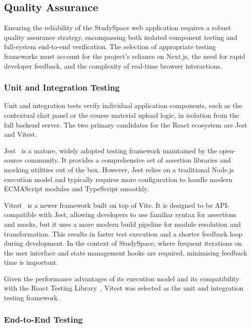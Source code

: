 \subsection{Quality Assurance}
\label{subsec:quality-assurance}

Ensuring the reliability of the StudySpace web application requires a robust quality assurance strategy, encompassing both isolated component testing and full-system end-to-end verification. The selection of appropriate testing frameworks must account for the project's reliance on Next.js, the need for rapid developer feedback, and the complexity of real-time browser interactions.

\subsubsection{Unit and Integration Testing}
\label{subsubsec:unit-integration-testing}

Unit and integration tests verify individual application components, such as the contextual chat panel or the course material upload logic, in isolation from the full backend server. The two primary candidates for the React ecosystem are Jest and Vitest.

Jest~\cite{Jest} is a mature, widely adopted testing framework maintained by the open-source community. It provides a comprehensive set of assertion libraries and mocking utilities out of the box. However, Jest relies on a traditional Node.js execution model and typically requires more configuration to handle modern ECMAScript modules and TypeScript smoothly.

Vitest~\cite{Vitest} is a newer framework built on top of Vite. It is designed to be API-compatible with Jest, allowing developers to use familiar syntax for assertions and mocks, but it uses a more modern build pipeline for module resolution and transformation. This results in faster test execution and a shorter feedback loop during development. In the context of StudySpace, where frequent iterations on the user interface and state management hooks are required, minimising feedback time is important.

Given the performance advantages of its execution model and its compatibility with the React Testing Library~\cite{ReactTestingLibrary}, Vitest was selected as the unit and integration testing framework.

\subsubsection{End-to-End Testing}
\label{subsubsec:e2e-testing}

